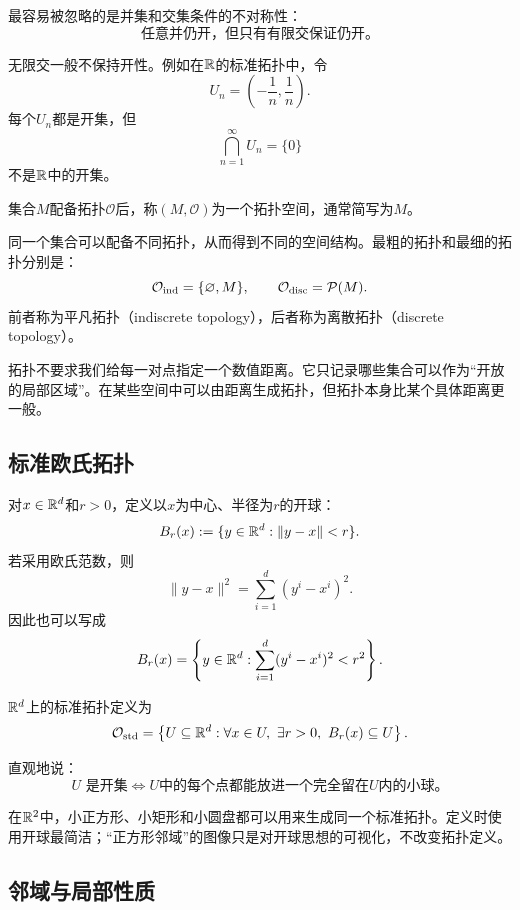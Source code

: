 最容易被忽略的是并集和交集条件的不对称性：
\[
    \boxed{\text{任意并仍开，但只有有限交保证仍开。}}
\]

无限交一般不保持开性。例如在$\R$的标准拓扑中，令
\[
    U_n=\left(-\frac1n,\frac1n\right).
\]
每个$U_n$都是开集，但
\[
    \bigcap_{n=1}^{\infty}U_n=\{0\}
\]
不是$\R$中的开集。

\begin{definition}[拓扑空间]
集合$M$配备拓扑$\mathcal O$后，称$(M,\mathcal O)$为一个拓扑空间，通常简写为$M$。
\end{definition}

同一个集合可以配备不同拓扑，从而得到不同的空间结构。最粗的拓扑和最细的拓扑分别是：
\[
    \mathcal O_{\mathrm{ind}}=\{\varnothing,M\},
    \qquad
    \mathcal O_{\mathrm{disc}}=\P(M).
\]
前者称为平凡拓扑（indiscrete topology），后者称为离散拓扑（discrete topology）。

\begin{remark}[拓扑不是距离]
拓扑不要求我们给每一对点指定一个数值距离。它只记录哪些集合可以作为“开放的局部区域”。在某些空间中可以由距离生成拓扑，但拓扑本身比某个具体距离更一般。
\end{remark}

\subsection{标准欧氏拓扑}

对$x\in\R^d$和$r>0$，定义以$x$为中心、半径为$r$的开球：
\[
    B_r(x)
    :=
    \{y\in\R^d:\|y-x\|<r\}.
\]
若采用欧氏范数，则
\[
    \|y-x\|^2
    =
    \sum_{i=1}^d(y^i-x^i)^2.
\]
因此也可以写成
\[
    B_r(x)
    =
    \left\{
    y\in\R^d:
    \sum_{i=1}^d(y^i-x^i)^2<r^2
    \right\}.
\]

\begin{definition}[标准欧氏拓扑]
$\R^d$上的标准拓扑定义为
\[
    \mathcal O_{\mathrm{std}}
    =
    \left\{
    U\subseteq\R^d:
    \forall x\in U,\ \exists r>0,\ B_r(x)\subseteq U
    \right\}.
\]
\end{definition}

直观地说：
\[
    U\text{ 是开集}
    \iff
    \text{$U$中的每个点都能放进一个完全留在$U$内的小球。}
\]

\begin{remark}[球不是唯一的局部形状]
在$\R^2$中，小正方形、小矩形和小圆盘都可以用来生成同一个标准拓扑。定义时使用开球最简洁；“正方形邻域”的图像只是对开球思想的可视化，不改变拓扑定义。
\end{remark}

\subsection{邻域与局部性质}

